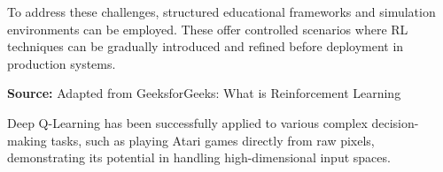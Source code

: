 \documentclass{report}
\begin{document}
To address these challenges, structured educational frameworks and simulation environments can be employed. These offer controlled scenarios where RL techniques can be gradually introduced and refined before deployment in production systems.


\noindent\textbf{Source:} Adapted from GeeksforGeeks: What is Reinforcement Learning


Deep Q-Learning has been successfully applied to various complex decision-making tasks, such as playing Atari games directly from raw pixels, demonstrating its potential in handling high-dimensional input spaces.



\end{document}
